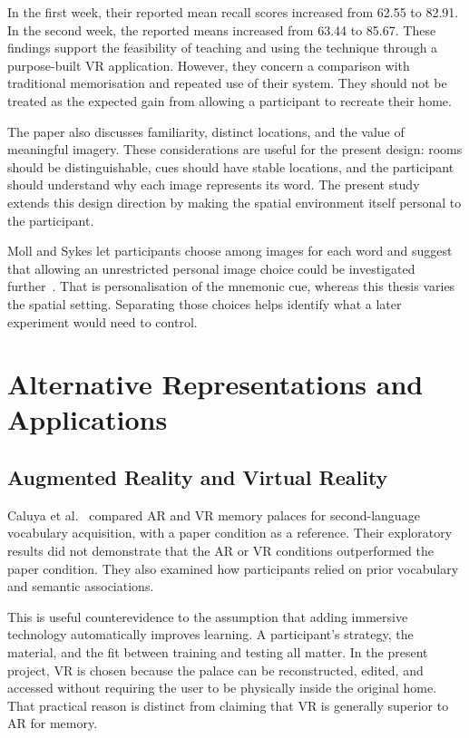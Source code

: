 In the first week, their reported mean recall scores increased from 62.55 to 82.91. In the second week, the reported means increased from 63.44 to 85.67. These findings support the feasibility of teaching and using the technique through a purpose-built VR application. However, they concern a comparison with traditional memorisation and repeated use of their system. They should not be treated as the expected gain from allowing a participant to recreate their home.

The paper also discusses familiarity, distinct locations, and the value of meaningful imagery. These considerations are useful for the present design: rooms should be distinguishable, cues should have stable locations, and the participant should understand why each image represents its word. The present study extends this design direction by making the spatial environment itself personal to the participant.

Moll and Sykes let participants choose among images for each word and suggest that allowing an unrestricted personal image choice could be investigated further~\cite{moll2023}. That is personalisation of the mnemonic cue, whereas this thesis varies the spatial setting. Separating those choices helps identify what a later experiment would need to control.

\section{Alternative Representations and Applications}
\subsection{Augmented Reality and Virtual Reality}
Caluya et al.~\cite{caluya2023} compared AR and VR memory palaces for second-language vocabulary acquisition, with a paper condition as a reference. Their exploratory results did not demonstrate that the AR or VR conditions outperformed the paper condition. They also examined how participants relied on prior vocabulary and semantic associations.

This is useful counterevidence to the assumption that adding immersive technology automatically improves learning. A participant's strategy, the material, and the fit between training and testing all matter. In the present project, VR is chosen because the palace can be reconstructed, edited, and accessed without requiring the user to be physically inside the original home. That practical reason is distinct from claiming that VR is generally superior to AR for memory.

